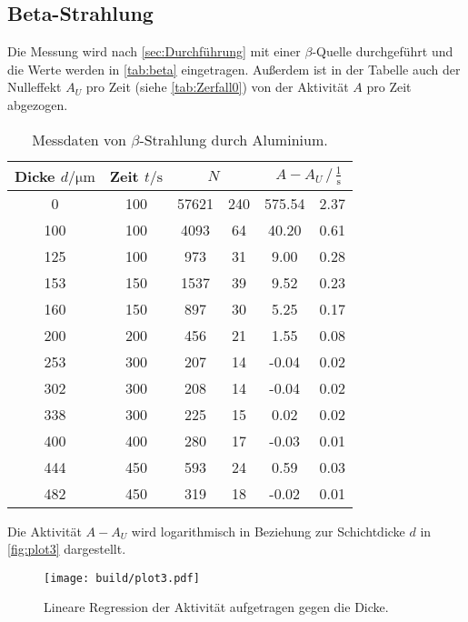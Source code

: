 \subsection{Beta-Strahlung}
\label{sub:beta_aus}
Die Messung wird nach \autoref{sec:Durchführung} mit einer $\beta$-Quelle durchgeführt und die Werte werden in \autoref{tab:beta} eingetragen. 
Außerdem ist in der Tabelle auch der Nulleffekt $A_U$ pro Zeit (siehe \autoref{tab:Zerfall0}) von der Aktivität $A$ pro Zeit abgezogen.

\begin{table}[H]
  \centering
  \caption{Messdaten von $\beta$-Strahlung durch Aluminium.}
  \label{tab:beta}
  \begin{tabular}{S[table-format=3.0] S[table-format=3.0] S[table-format=5.0] @{${}\pm{}$} S[table-format=3.2] S[table-format=3.2] @{${}\pm{}$} S[table-format=2.2]}
  \toprule
  {Dicke $d / \si{\micro\meter}$} & {Zeit $t / \si{\second}$} &  &  \\
     &   100 &   57621   &   240 &   575.54  &   2.37   \\
      100 &   100 &   4093    &   64  &   40.20   &   0.61    \\
      125 &   100 &   973     &   31  &   9.00    &   0.28    \\
      153 &   150 &   1537    &   39  &   9.52    &   0.23    \\
      160 &   150 &   897     &   30  &   5.25    &   0.17    \\
      200 &   200 &   456     &   21  &   1.55    &   0.08    \\
      253 &   300 &   207     &   14  &   -0.04   &   0.02    \\
      302 &   300 &   208     &   14  &   -0.04   &   0.02    \\
      338 &   300 &   225     &   15  &   0.02    &   0.02    \\
      400 &   400 &   280     &   17  &   -0.03   &   0.01    \\
      444 &   450 &   593     &   24  &   0.59    &   0.03    \\
      482 &   450 &   319     &   18  &   -0.02   &   0.01    \\
  \bottomrule
  \end{tabular}
\end{table}


 Die Aktivität $A-A_U$ wird logarithmisch in Beziehung zur Schichtdicke $d$ in \autoref{fig:plot3} dargestellt.
\begin{figure}[H]
  \centering
  \texttt{[image: build/plot3.pdf]}
  \caption {Lineare Regression der Aktivität aufgetragen gegen die Dicke.}
  \label{fig:plot3}
\end{figure}

